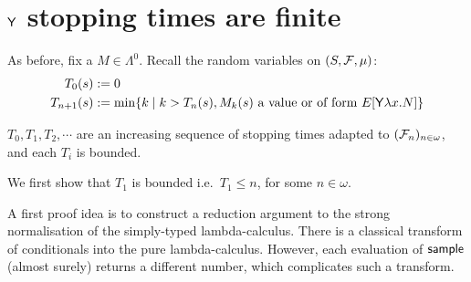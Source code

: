 
\newcommand\transform[1]{{\ulcorner{#1}\urcorner}}

\section{$\mathsf{Y}$ stopping times are finite}

As before, fix a $M \in \Lambda^0$.
Recall the random variables on $(S, \mathcal{F}, \mu)$:
\begin{align*}
T_0(s) & := 0 \\
T_{n+1}(s) & := \min \{ k \mid k>T_n(s), M_k(s) \textrm{ a value or of form } E[\mathsf{Y} \lambda x. N] \}
\end{align*}

\begin{lemma}
$T_0, T_1, T_2, \cdots$ are an increasing sequence of stopping times adapted to $(\mathcal{F}_n)_{n \in \omega}$, and each $T_i$ is bounded.
\end{lemma}

We first show that $T_1$ is bounded i.e.~$T_1 \leq n$, for some $n \in \omega$.

A first proof idea is to construct a reduction argument to the strong normalisation of the simply-typed lambda-calculus.
 There is a classical transform of conditionals into the pure lambda-calculus.
However, each evaluation of $\mathsf{sample}$ (almost surely) returns a different number, which complicates such a transform.


